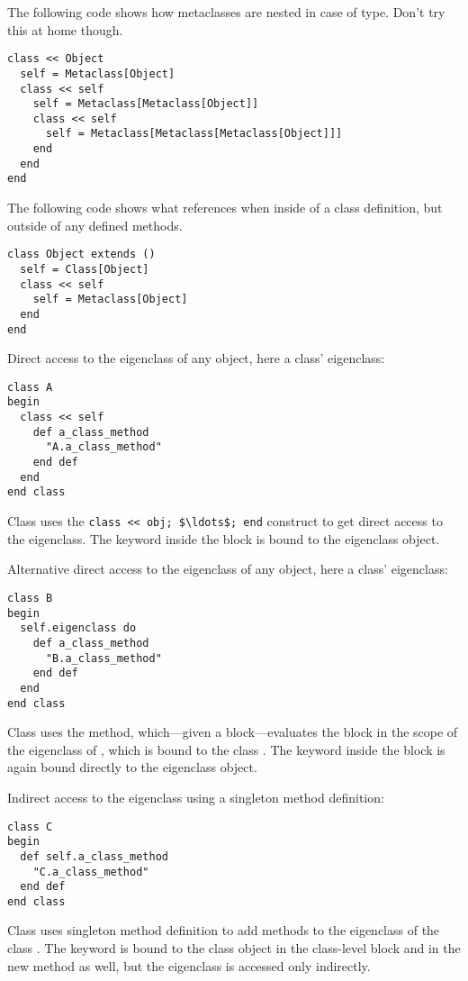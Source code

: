 \example The following code shows how metaclasses are nested in case of  type. Don't try this at home though. 
\begin{lstlisting}
class << Object
  self = Metaclass[Object]
  class << self
    self = Metaclass[Metaclass[Object]]
    class << self
      self = Metaclass[Metaclass[Metaclass[Object]]]
    end
  end
end
\end{lstlisting}

\example The following code shows what  references when inside of a class definition, but outside of any defined methods. 
\begin{lstlisting}
class Object extends ()
  self = Class[Object]
  class << self
    self = Metaclass[Object]
  end
end
\end{lstlisting}

\example Direct access to the eigenclass of any object, here a class' eigenclass:
\begin{lstlisting}
class A
begin
  class << self
    def a_class_method
      "A.a_class_method"
    end def
  end
end class
\end{lstlisting}
Class  uses the \lstinline!class << obj; $\ldots$; end! construct to get direct access to the eigenclass. The keyword  inside the block is bound to the eigenclass object. 

\example Alternative direct access to the eigenclass of any object, here a class' eigenclass:
\begin{lstlisting}
class B
begin
  self.eigenclass do
    def a_class_method
      "B.a_class_method"
    end def
  end
end class
\end{lstlisting}
Class  uses the  method, which---given a block---evaluates the block in the scope of the eigenclass of , which is bound to the class . The keyword  inside the block is again bound directly to the eigenclass object. 

\example Indirect access to the eigenclass using a singleton method definition:
\begin{lstlisting}
class C
begin
  def self.a_class_method
    "C.a_class_method"
  end def
end class
\end{lstlisting}
Class  uses singleton method definition to add methods to the eigenclass of the class . The keyword  is bound to the class object in the class-level block and in the new method as well, but the eigenclass is accessed only indirectly. 

